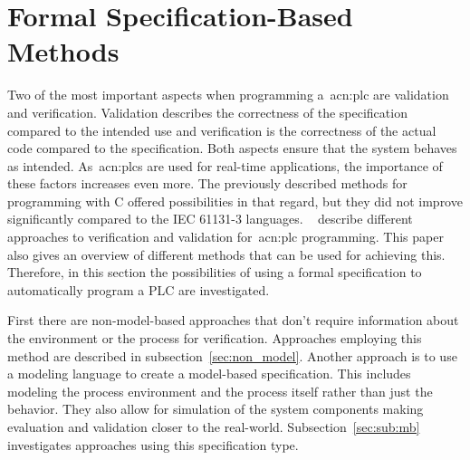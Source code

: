 \chapter{Formal Specification-Based Methods}
\label{sec:formal_methods}

Two of the most important aspects when programming a~\acrshort{acn:plc} are validation and verification.
Validation describes the correctness of the specification compared to the intended use and verification is the correctness of the actual code compared to the specification.
Both aspects ensure that the system behaves as intended.
As~\glspl{acn:plc} are used for real-time applications, the importance of these factors increases even more.
The previously described methods for programming with C offered possibilities in that regard, but they did not improve significantly compared to the IEC 61131-3 languages.
\citeauthor{Frey:2000aa}~\cite{Frey:2000aa} describe different approaches to verification and validation for~\acrshort{acn:plc} programming.
This paper also gives an overview of different methods that can be used for achieving this.
Therefore, in this section the possibilities of using a formal specification to automatically program a PLC are investigated.

First there are non-model-based approaches that don't require information about the environment or the process for verification.
Approaches employing this method are described in subsection~\ref{sec:non_model}.
Another approach is to use a modeling language to create a model-based specification.
This includes modeling the process environment and the process itself rather than just the behavior.
They also allow for simulation of the system components making evaluation and validation closer to the real-world.
Subsection~\ref{sec:sub:mb} investigates approaches using this specification type.

